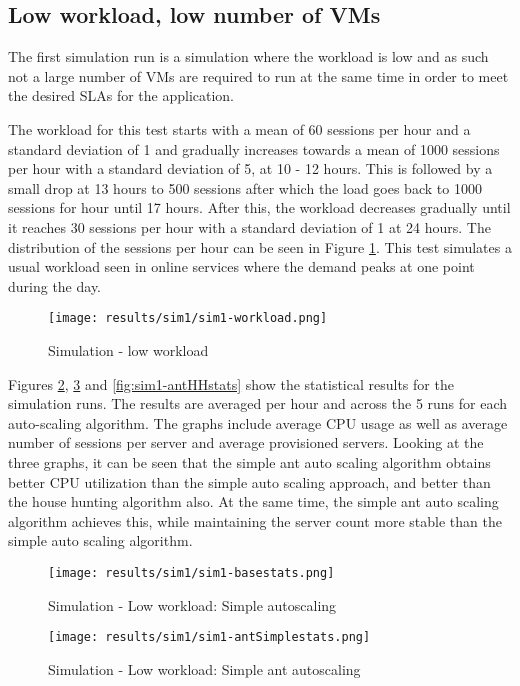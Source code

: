 \documentclass[conference]{IEEEtran}
\begin{document}
\subsection{Low workload, low number of VMs}

The first simulation run is a simulation where the workload is low and as such not a large number of VMs are required to run at the same time in order to meet the desired SLAs for the application.

The workload for this test starts with a mean of 60 sessions per hour and a standard deviation of 1 and gradually increases towards a mean of 1000 sessions per hour with a standard deviation of 5, at 10 - 12 hours. This is followed by a small drop at 13 hours to 500 sessions after which the load goes back to 1000 sessions for hour until 17 hours. After this, the workload decreases gradually until it reaches 30 sessions per hour with a standard deviation of 1 at 24 hours. The distribution of the sessions per hour can be seen in Figure \ref{fig:sim1-workload}. This test simulates a usual workload seen in online services where the demand peaks at one point during the day.

\begin{figure}
	\centering
		\texttt{[image: results/sim1/sim1-workload.png]}
	\caption{Simulation - low workload}
	\label{fig:sim1-workload}
\end{figure}

Figures \ref{fig:sim1-basestats}, \ref{fig:sim1-antSimplestats} and \ref{fig:sim1-antHHstats} show the statistical results for the simulation runs. The results are averaged per hour and across the 5 runs for each auto-scaling algorithm. The graphs include average CPU usage as well as average number of sessions per server and average provisioned servers. Looking at the three graphs, it can be seen that the simple ant auto scaling algorithm obtains better CPU utilization than the simple auto scaling approach, and better than the house hunting algorithm also. At the same time, the simple ant auto scaling algorithm achieves this, while maintaining the server count more stable than the simple auto scaling algorithm.

\begin{figure}
	\centering
		\texttt{[image: results/sim1/sim1-basestats.png]}
	\caption{Simulation - Low workload: Simple autoscaling}
	\label{fig:sim1-basestats}
\end{figure}

\begin{figure}
	\centering
		\texttt{[image: results/sim1/sim1-antSimplestats.png]}
	\caption{Simulation - Low workload: Simple ant autoscaling}
	\label{fig:sim1-antSimplestats}
\end{figure}
\end{document}
